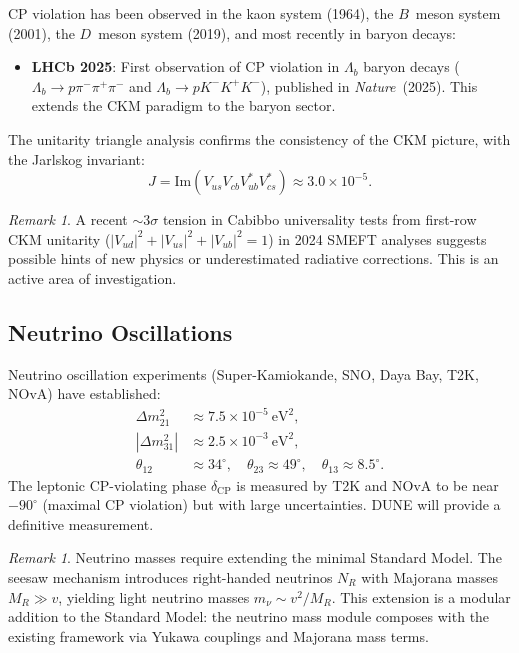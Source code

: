 \documentclass[12pt]{article}
\theoremstyle{definition}
\theoremstyle{remark}
\newtheorem{remark}[theorem]{Remark}
\begin{document}
CP violation has been observed in the kaon system (1964), the $B$~meson system (2001), the $D$~meson system (2019), and most recently in baryon decays:

\begin{itemize}
\item \textbf{LHCb 2025}: First observation of CP violation in $\Lambda_b$ baryon decays ($\Lambda_b \to p\pi^-\pi^+\pi^-$ and $\Lambda_b \to pK^-K^+K^-$), published in \textit{Nature}~(2025). This extends the CKM paradigm to the baryon sector.
\end{itemize}

The unitarity triangle analysis confirms the consistency of the CKM picture, with the Jarlskog invariant:
\begin{equation}
J = \mathrm{Im}(V_{us} V_{cb} V_{ub}^* V_{cs}^*) \approx 3.0 \times 10^{-5}.
\end{equation}

\begin{remark}
A recent $\sim 3\sigma$ tension in Cabibbo universality tests from first-row CKM unitarity ($|V_{ud}|^2 + |V_{us}|^2 + |V_{ub}|^2 = 1$) in 2024 SMEFT analyses suggests possible hints of new physics or underestimated radiative corrections. This is an active area of investigation.
\end{remark}

\subsection{Neutrino Oscillations}

Neutrino oscillation experiments (Super-Kamiokande, SNO, Daya Bay, T2K, NOvA) have established:
\begin{align}
\Delta m_{21}^2 &\approx 7.5 \times 10^{-5}~\text{eV}^2, \\
|\Delta m_{31}^2| &\approx 2.5 \times 10^{-3}~\text{eV}^2, \\
\theta_{12} &\approx 34^\circ, \quad \theta_{23} \approx 49^\circ, \quad \theta_{13} \approx 8.5^\circ.
\end{align}
The leptonic CP-violating phase $\delta_{\mathrm{CP}}$ is measured by T2K and NOvA to be near $-90^\circ$ (maximal CP violation) but with large uncertainties. DUNE will provide a definitive measurement.

\begin{remark}
Neutrino masses require extending the minimal Standard Model. The seesaw mechanism introduces right-handed neutrinos $N_R$ with Majorana masses $M_R \gg v$, yielding light neutrino masses $m_\nu \sim v^2/M_R$. This extension is a modular addition to the Standard Model: the neutrino mass module composes with the existing framework via Yukawa couplings and Majorana mass terms.
\end{remark}
\end{document}
